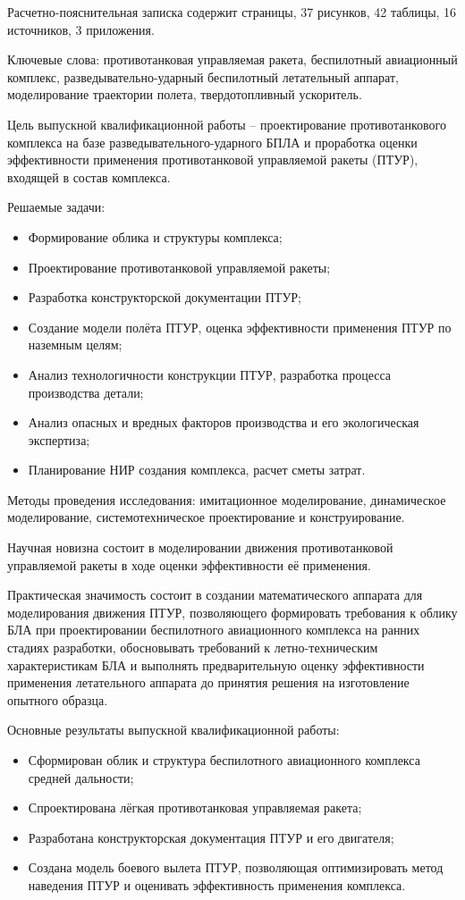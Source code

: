 \Referat

Расчетно-пояснительная записка содержит \pageref{LastPage} страницы, 37 рисунков, 42 таблицы, 16 источников, 3 приложения.

Ключевые слова: противотанковая управляемая ракета, беспилотный авиационный комплекс, разведывательно-ударный беспилотный летательный аппарат, моделирование траектории полета, твердотопливный ускоритель.

Цель выпускной квалификационной работы – проектирование противотанкового комплекса на базе разведывательного-ударного БПЛА и проработка оценки эффективности применения противотанковой управляемой ракеты (ПТУР), входящей в состав комплекса.

Решаемые задачи:
\begin{itemize}
	\item Формирование облика и структуры комплекса;
	\item Проектирование противотанковой управляемой ракеты;
	\item Разработка конструкторской документации ПТУР;
	\item Создание модели полёта ПТУР, оценка эффективности применения ПТУР по наземным целям;
	\item Анализ технологичности конструкции ПТУР, разработка процесса производства детали;
	\item Анализ опасных и вредных факторов производства и его экологическая экспертиза;
	\item Планирование НИР создания комплекса, расчет сметы затрат.
\end{itemize}

Методы проведения исследования: имитационное моделирование, динамическое моделирование, системотехническое проектирование и конструирование.

Научная новизна состоит в моделировании движения противотанковой управляемой ракеты в ходе оценки эффективности её применения.

Практическая значимость состоит в создании математического аппарата для моделирования движения ПТУР, позволяющего формировать требования к облику БЛА при проектировании беспилотного авиационного комплекса на ранних стадиях разработки, обосновывать требований к летно-техническим характеристикам БЛА и выполнять предварительную оценку эффективности применения летательного аппарата до принятия решения на изготовление опытного образца.

Основные результаты выпускной квалификационной работы:
\begin{itemize}
	\item Сформирован облик и структура беспилотного авиационного комплекса средней дальности;
	\item Спроектирована лёгкая противотанковая управляемая ракета;
	\item Разработана конструкторская документация ПТУР и его двигателя;
	\item Создана модель боевого вылета ПТУР, позволяющая оптимизировать метод наведения ПТУР и оценивать эффективность применения комплекса.
\end{itemize}
